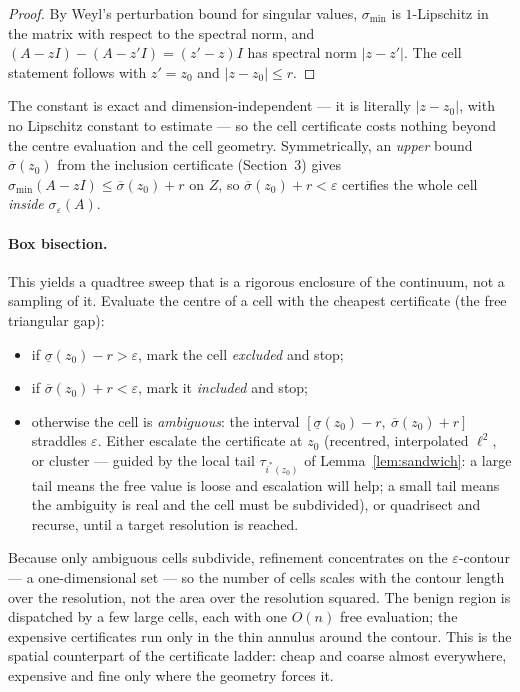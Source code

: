 \documentclass[11pt, a4paper]{article}
\numberwithin{equation}{section}
\newcommand{\abs}[1]{\left|#1\right|}
\begin{document}
\begin{proof}
By Weyl's perturbation bound for singular values, $\sigma_{\min}$ is
$1$-Lipschitz in the matrix with respect to the spectral norm, and $(A - zI) -
(A - z'I) = (z' - z)I$ has spectral norm $\abs{z - z'}$.  The cell statement
follows with $z' = z_0$ and $\abs{z - z_0}\le r$.
\end{proof}

The constant is exact and dimension-independent --- it is literally $\abs{z -
z_0}$, with no Lipschitz constant to estimate --- so the cell certificate costs
nothing beyond the centre evaluation and the cell geometry.  Symmetrically, an
\emph{upper} bound $\overline{\sigma}(z_0)$ from the inclusion certificate
(Section~3) gives $\sigma_{\min}(A - zI) \le \overline{\sigma}(z_0) + r$ on $Z$,
so $\overline{\sigma}(z_0) + r < \varepsilon$ certifies the whole cell
\emph{inside} $\sigma_\varepsilon(A)$.

\paragraph{Box bisection.}
This yields a quadtree sweep that is a rigorous enclosure of the continuum, not
a sampling of it.  Evaluate the centre of a cell with the cheapest certificate
(the free triangular gap):
\begin{itemize}
  \item if $\underline{\sigma}(z_0) - r > \varepsilon$, mark the cell
    \emph{excluded} and stop;
  \item if $\overline{\sigma}(z_0) + r < \varepsilon$, mark it \emph{included}
    and stop;
  \item otherwise the cell is \emph{ambiguous}: the interval
    $[\underline{\sigma}(z_0) - r,\ \overline{\sigma}(z_0) + r]$ straddles
    $\varepsilon$.  Either escalate the certificate at $z_0$ (recentred,
    interpolated $\ell^2$, or cluster --- guided by the local tail
    $\tau_{i^*(z_0)}$ of Lemma~\ref{lem:sandwich}: a large tail means the free
    value is loose and escalation will help; a small tail means the ambiguity is
    real and the cell must be subdivided), or quadrisect and recurse, until a
    target resolution is reached.
\end{itemize}
Because only ambiguous cells subdivide, refinement concentrates on the
$\varepsilon$-contour --- a one-dimensional set --- so the number of cells scales
with the contour length over the resolution, not the area over the resolution
squared.  The benign region is dispatched by a few large cells, each with one
$O(n)$ free evaluation; the expensive certificates run only in the thin annulus
around the contour.  This is the spatial counterpart of the certificate ladder:
cheap and coarse almost everywhere, expensive and fine only where the geometry
forces it.
\end{document}
